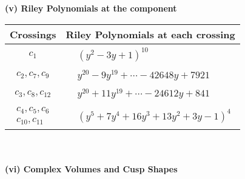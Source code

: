 \documentclass[1p]{elsarticle_modified}
\theoremstyle{definition}
\begin{document}
\newpage\renewcommand{\arraystretch}{1}
\flushleft \textbf{(v) Riley Polynomials at the component}\newline \\
\begin{tabular}{m{50pt}|m{274pt}}
Crossings & \hspace{64pt}Riley Polynomials at each crossing \\
\hline $$\begin{aligned}c_{1}\end{aligned}$$&$\begin{aligned}
&(y^2-3 y+1)^{10}
\end{aligned}$\\
\hline $$\begin{aligned}c_{2},c_{7},c_{9}\end{aligned}$$&$\begin{aligned}
&y^{20}-9 y^{19}+\cdots-42648 y+7921
\end{aligned}$\\
\hline $$\begin{aligned}c_{3},c_{8},c_{12}\end{aligned}$$&$\begin{aligned}
&y^{20}+11 y^{19}+\cdots-24612 y+841
\end{aligned}$\\
\hline $$\begin{aligned}c_{4},c_{5},c_{6}\\c_{10},c_{11}\end{aligned}$$&$\begin{aligned}
&(y^5+7 y^4+16 y^3+13 y^2+3 y-1)^4
\end{aligned}$\\
\hline
\end{tabular}\\~\\
\newpage\flushleft \textbf{(vi) Complex Volumes and Cusp Shapes}
\end{document}
